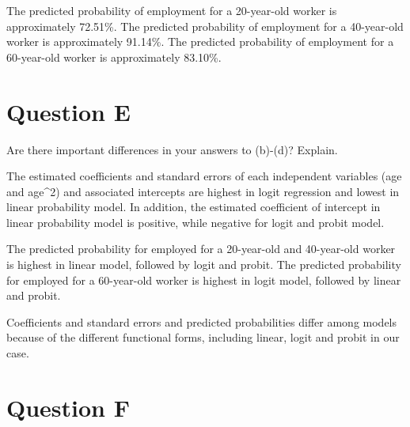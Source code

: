 \documentclass[
]{article}
\begin{document}
The predicted probability of employment for a 20-year-old worker is
approximately 72.51\%. The predicted probability of employment for a
40-year-old worker is approximately 91.14\%. The predicted probability
of employment for a 60-year-old worker is approximately 83.10\%.

\hypertarget{question-e}{%
\section{Question E}\label{question-e}}

Are there important differences in your answers to (b)-(d)? Explain.

\vspace{1em}

The estimated coefficients and standard errors of each independent
variables (age and age\^{}2) and associated intercepts are highest in
logit regression and lowest in linear probability model. In addition,
the estimated coefficient of intercept in linear probability model is
positive, while negative for logit and probit model.

The predicted probability for employed for a 20-year-old and 40-year-old
worker is highest in linear model, followed by logit and probit. The
predicted probability for employed for a 60-year-old worker is highest
in logit model, followed by linear and probit.

Coefficients and standard errors and predicted probabilities differ
among models because of the different functional forms, including
linear, logit and probit in our case.

\hypertarget{question-f}{%
\section{Question F}\label{question-f}}
\end{document}
